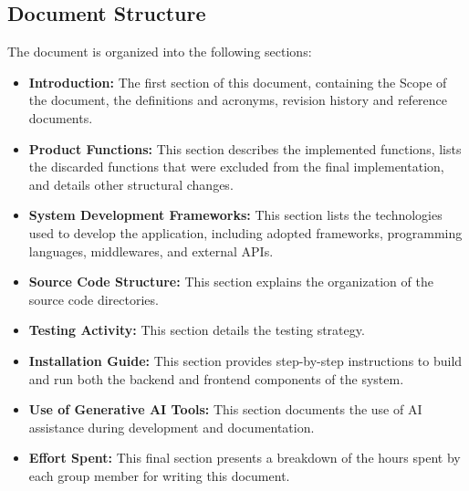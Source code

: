 \subsection{Document Structure}
The document is organized into the following sections:
\begin{itemize}
    \item[] \textbf{Introduction:} The first section of this document, containing the Scope of the document, the definitions and acronyms, revision history and reference documents.

    \item[] \textbf{Product Functions:} This section describes the implemented functions, lists the discarded functions that were excluded from the final implementation, and details other structural changes.

    \item[] \textbf{System Development Frameworks:} This section lists the technologies used to develop the application, including adopted frameworks, programming languages, middlewares, and external APIs.

    \item[] \textbf{Source Code Structure:} This section explains the organization of the source code directories.

    \item[] \textbf{Testing Activity:} This section details the testing strategy.

    \item[] \textbf{Installation Guide:} This section provides step-by-step instructions to build and run both the backend and frontend components of the system.

    \item[] \textbf{Use of Generative AI Tools:} This section documents the use of AI assistance during development and documentation.

    \item[] \textbf{Effort Spent:} This final section presents a breakdown of the hours spent by each group member for writing this document.
\end{itemize}